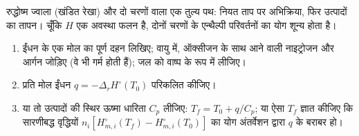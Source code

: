 \begin{omfigure}

{\small रुद्धोष्म ज्वाला (खंडित रेखा) और दो चरणों वाला
एक तुल्य पथ: नियत ताप पर अभिक्रिया, फिर उत्पादों का तापन।
चूँकि $H$ एक अवस्था फलन है, दोनों चरणों के एन्थैल्पी परिवर्तनों का योग
शून्य होता है।}
\end{omfigure}

\begin{method}[ज्वाला का ताप]\label{met:b2:reaction-enthalpy:flame-temperature}
\begin{enumerate}
  \item ईंधन के एक मोल का पूर्ण दहन लिखिए; वायु में, ऑक्सीजन के साथ आने वाली
        नाइट्रोजन और आर्गन जोड़िए (वे भी गर्म होती
        हैं); जल को वाष्प के रूप में लीजिए।
  \item प्रति मोल ईंधन $q = -\Delta_r H^\circ(T_0)$ परिकलित कीजिए।
  \item या तो उत्पादों की स्थिर ऊष्मा धारिता $C_p$ लीजिए:
        $T_f = T_0 + q/C_p$; या ऐसा $T_f$ ज्ञात कीजिए कि सारणीबद्ध
        वृद्धियों $n_i[H^\circ_{m,i}(T_f) - H^\circ_{m,i}(T_0)]$ का योग
        अंतर्वेशन द्वारा $q$ के बराबर हो।
\end{enumerate}
\end{method}

